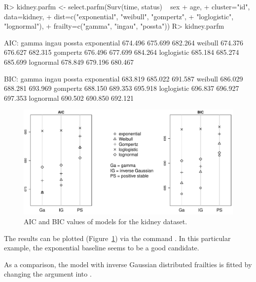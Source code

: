 \begin{CodeChunk}
\begin{CodeInput}
R> kidney.parfm <- select.parfm(Surv(time, status) ~ sex + age, 
+    cluster="id", data=kidney,
+    dist=c("exponential", "weibull", "gompertz",
+           "loglogistic", "lognormal"),
+    frailty=c("gamma", "ingau", "possta"))
R> kidney.parfm
\end{CodeInput}
\begin{CodeOutput}
AIC:
              gamma   ingau  possta
exponential 674.496 675.699 682.264
weibull     674.376 676.627 682.315
gompertz    676.496 677.699 684.264
loglogistic 685.184 685.274 685.699
lognormal   678.849 679.196 680.467


BIC:
              gamma   ingau  possta
exponential 683.819 685.022 691.587
weibull     686.029 688.281 693.969
gompertz    688.150 689.353 695.918
loglogistic 696.837 696.927 697.353
lognormal   690.502 690.850 692.121
\end{CodeOutput}
\end{CodeChunk}

\begin{figure}
  \centering
  \includegraphics[width=.95\textwidth]{./graphs/plot.pdf}
  \caption{AIC and BIC values of  models for the {kidney} dataset.}
  \label{fig:kidney.parfm}
\end{figure}

The results can be plotted (Figure~\ref{fig:kidney.parfm}) via the command .
In this particular example, the exponential baseline seems to be a good candidate.

As a comparison, the model with inverse Gaussian distributed frailties
  is fitted by changing the  argument into .

